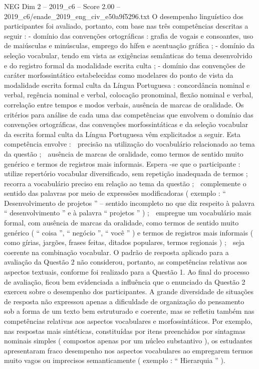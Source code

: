 \begin{textsample}{NEG Dim 2 – 2019\_c6 – Score 2.00 – 2019\_c6/enade\_2019\_eng\_civ\_e50a9f5296.txt}
O desempenho linguístico dos participantes foi avaliado, portanto, com base nas três competências descritas a seguir : - domínio das convenções ortográficas : grafia de vogais e consoantes, uso de maiúsculas e minúsculas, emprego do hífen e acentuação gráfica ; - domínio da seleção vocabular, tendo em vista as exigências semânticas do tema desenvolvido e do registro formal da modalidade escrita culta ; - domínio das convenções de caráter morfossintático estabelecidas como modelares do ponto de vista da modalidade escrita formal culta da Língua Portuguesa : concordância nominal e verbal, regência nominal e verbal, colocação pronominal, flexão nominal e verbal, correlação entre tempos e modos verbais, ausência de marcas de oralidade.
Os critérios para análise de cada uma das competências que envolvem o domínio das convenções ortográficas, das convenções morfossintáticas e da seleção vocabular da escrita formal culta da Língua Portuguesa vêm explicitados a seguir.
Esta competência envolve :  precisão na utilização do vocabulário relacionado ao tema da questão ;  ausência de marcas de oralidade, como termos de sentido muito genérico e termos de registros mais informais.
Espera -se que o participante :  utilize repertório vocabular diversificado, sem repetição inadequada de termos ;  recorra a vocabulário preciso em relação ao tema da questão ;  complemente o sentido das palavras por meio de expressões modificadoras ( exemplo : “ Desenvolvimento de projetos ” – sentido incompleto no que diz respeito à palavra “ desenvolvimento ” e à palavra “ projetos ” ) ;  empregue um vocabulário mais formal, com ausência de marcas da oralidade, como termos de sentido muito genérico ( “ coisa ”, “ negócio ”, “ você ” ) e termos de registros mais informais ( como gírias, jargões, frases feitas, ditados populares, termos regionais ) ;  seja coerente na combinação vocabular.
O padrão de resposta aplicado para a avaliação da Questão 2 não considerou, portanto, as competências relativas aos aspectos textuais, conforme foi realizado para a Questão 1.
Ao final do processo de avaliação, ficou bem evidenciada a influência que o enunciado da Questão 2 exerceu sobre o desempenho dos participantes.
A grande diversidade de situações de resposta não expressou apenas a dificuldade de organização do pensamento sob a forma de um texto bem estruturado e coerente, mas se refletiu também nas competências relativas aos aspectos vocabulares e morfossintáticos.
Por exemplo, nas respostas mais sintéticas, constituídas por itens preenchidos por sintagmas nominais simples ( compostos apenas por um núcleo substantivo ), os estudantes apresentaram fraco desempenho nos aspectos vocabulares ao empregarem termos muito vagos ou imprecisos semanticamente ( exemplo : “ Hierarquia ” ).

\end{textsample}
